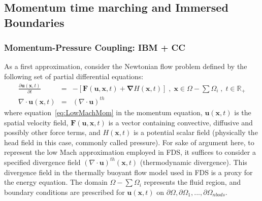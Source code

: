 \documentclass[12pt]{article}
\begin{document}
\subsection{Momentum time marching and Immersed Boundaries}

\subsubsection{Momentum-Pressure Coupling: IBM + CC}

As a first approximation, consider the Newtonian flow problem defined by the following set of partial differential equations:
%
\begin{eqnarray}
  \frac{\partial \mathbf{u}(\mathbf{x},t)}{\partial t} &=& - \left[ \mathbf{F}(\mathbf{u},\mathbf{x},t) + \boldsymbol{\nabla} H(\mathbf{x},t) \right] \; , \; \mathbf{x} \in \Omega - \sum{\Omega_i} \; , \; t \in \mathbb{R}_+ \label{eq:LowMachMom} \\
         \nabla \cdot \mathbf{u} (\mathbf{x},t) & = & \left(\nabla \cdot \mathbf{u} \right)^{th} \label{eq:LowMachDiv}
\end{eqnarray}
%
where equation~\eqref{eq:LowMachMom} in the momentum equation, $\mathbf{u}(\mathbf{x},t)$ is the spatial velocity field, $\mathbf{F}(\mathbf{u},\mathbf{x},t)$ is a vector containing convective, diffusive and possibly other force terms, and $H(\mathbf{x},t)$ is a potential scalar field (physically the head field in this case, commonly called pressure). For sake of argument here, to represent the low Mach approximation employed in FDS, it suffices to consider a specified divergence field $\left(\nabla \cdot \mathbf{u} \right)^{th} (\mathbf{x},t)$ (thermodynamic divergence). This divergence field in the thermally buoyant flow model used in FDS is a proxy for the energy equation.
The domain $\Omega - \sum{\Omega_i}$ represents the fluid region, and boundary conditions are prescribed for $\mathbf{u}(\mathbf{x},t)$ on $\partial \Omega,\partial \Omega_1,...,\partial \Omega_{nbods}$.
\end{document}
